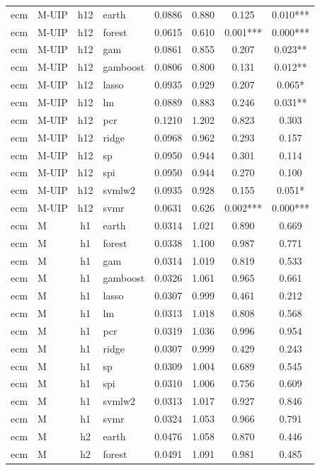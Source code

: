 \begin{ThreePartTable}
\begin{longtable}[t]{llclcccc}
\addlinespace
ecm & M-UIP & h12 & earth & 0.0886 & 0.880 & 0.125 & 0.010***\\
ecm & M-UIP & h12 & forest & 0.0615 & 0.610 & 0.001*** & 0.000***\\
ecm & M-UIP & h12 & gam & 0.0861 & 0.855 & 0.207 & 0.023**\\
ecm & M-UIP & h12 & gamboost & 0.0806 & 0.800 & 0.131 & 0.012**\\
ecm & M-UIP & h12 & lasso & 0.0935 & 0.929 & 0.207 & 0.065*\\
ecm & M-UIP & h12 & lm & 0.0889 & 0.883 & 0.246 & 0.031**\\
ecm & M-UIP & h12 & pcr & 0.1210 & 1.202 & 0.823 & 0.303\\
ecm & M-UIP & h12 & ridge & 0.0968 & 0.962 & 0.293 & 0.157\\
ecm & M-UIP & h12 & sp & 0.0950 & 0.944 & 0.301 & 0.114\\
ecm & M-UIP & h12 & spi & 0.0950 & 0.944 & 0.270 & 0.100\\
ecm & M-UIP & h12 & svmlw2 & 0.0935 & 0.928 & 0.155 & 0.051*\\
ecm & M-UIP & h12 & svmr & 0.0631 & 0.626 & 0.002*** & 0.000***\\
\addlinespace
ecm & M & h1 & earth & 0.0314 & 1.021 & 0.890 & 0.669\\
ecm & M & h1 & forest & 0.0338 & 1.100 & 0.987 & 0.771\\
ecm & M & h1 & gam & 0.0314 & 1.019 & 0.819 & 0.533\\
ecm & M & h1 & gamboost & 0.0326 & 1.061 & 0.965 & 0.661\\
ecm & M & h1 & lasso & 0.0307 & 0.999 & 0.461 & 0.212\\
ecm & M & h1 & lm & 0.0313 & 1.018 & 0.808 & 0.568\\
ecm & M & h1 & pcr & 0.0319 & 1.036 & 0.996 & 0.954\\
ecm & M & h1 & ridge & 0.0307 & 0.999 & 0.429 & 0.243\\
ecm & M & h1 & sp & 0.0309 & 1.004 & 0.689 & 0.545\\
ecm & M & h1 & spi & 0.0310 & 1.006 & 0.756 & 0.609\\
ecm & M & h1 & svmlw2 & 0.0313 & 1.017 & 0.927 & 0.846\\
ecm & M & h1 & svmr & 0.0324 & 1.053 & 0.966 & 0.791\\
\addlinespace
ecm & M & h2 & earth & 0.0476 & 1.058 & 0.870 & 0.446\\
ecm & M & h2 & forest & 0.0491 & 1.091 & 0.981 & 0.485\\

\end{longtable}
\end{ThreePartTable}
